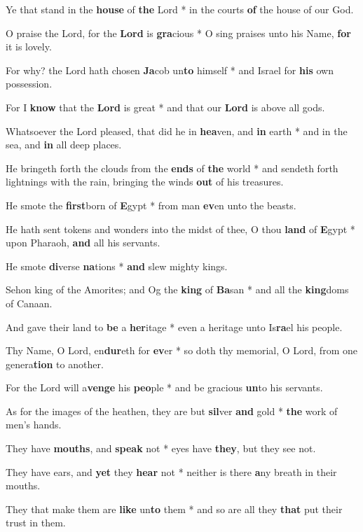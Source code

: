 \begin{multicols}{2}
	Ye that stand in the \textbf{house} of \textbf{the} Lord * in the courts \textbf{of} the house of our God.
	
	O praise the Lord, for the \textbf{Lord} is \textbf{gra}cious * O sing praises unto his Name, \textbf{for} it is lovely.
	
	For why? the Lord hath chosen \textbf{Ja}cob un\textbf{to} himself * and Israel for \textbf{his} own possession.
	
	For I \textbf{know} that the \textbf{Lord} is great * and that our \textbf{Lord} is above all gods.
	
	Whatsoever the Lord pleased, that did he in \textbf{hea}ven, and \textbf{in} earth * and in the sea, and \textbf{in} all deep places.
	
	He bringeth forth the clouds from the \textbf{ends} of \textbf{the} world * and sendeth forth lightnings with the rain, bringing the winds \textbf{out} of his treasures.
	
	He smote the \textbf{first}born of \textbf{E}gypt * from man \textbf{ev}en unto the beasts.
	
	He hath sent tokens and wonders into the midst of thee, O thou \textbf{land} of \textbf{E}gypt * upon Pharaoh, \textbf{and} all his servants.
	
	He smote \textbf{di}verse \textbf{na}tions * \textbf{and} slew mighty kings.
	
	Sehon king of the Amorites; and Og the \textbf{king} of \textbf{Ba}san * and all the \textbf{king}doms of Canaan.
	
	And gave their land to \textbf{be} a \textbf{her}itage * even a heritage unto Is\textbf{ra}el his people.
	
	Thy Name, O Lord, en\textbf{dur}eth for \textbf{ev}er * so doth thy memorial, O Lord, from one genera\textbf{tion} to another.
	
	For the Lord will a\textbf{venge} his \textbf{peo}ple * and be gracious \textbf{un}to his servants.
	
	As for the images of the heathen, they are but \textbf{sil}ver \textbf{and} gold * \textbf{the} work of men's hands.
	
	They have \textbf{mouths}, and \textbf{speak} not * eyes have \textbf{they}, but they see not.
	
	They have ears, and \textbf{yet} they \textbf{hear} not * neither is there \textbf{a}ny breath in their mouths.
	
	They that make them are \textbf{like} un\textbf{to} them * and so are all they \textbf{that} put their trust in them.
	

\end{multicols}
